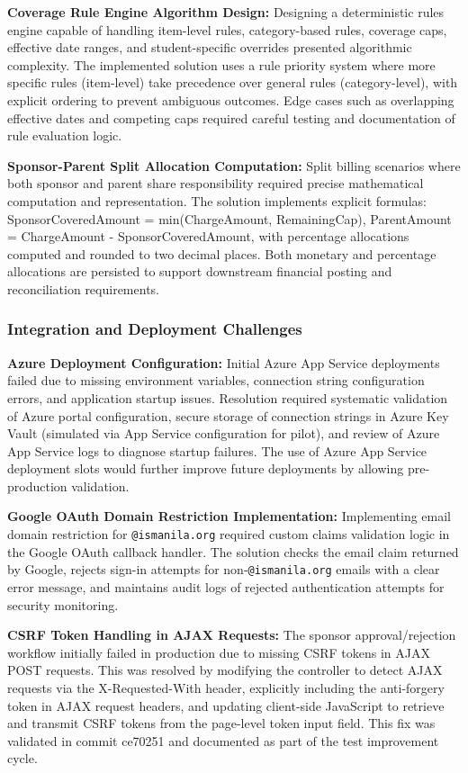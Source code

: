 \textbf{Coverage Rule Engine Algorithm Design:} Designing a deterministic rules engine capable of handling item-level rules, category-based rules, coverage caps, effective date ranges, and student-specific overrides presented algorithmic complexity. The implemented solution uses a rule priority system where more specific rules (item-level) take precedence over general rules (category-level), with explicit ordering to prevent ambiguous outcomes. Edge cases such as overlapping effective dates and competing caps required careful testing and documentation of rule evaluation logic.

\textbf{Sponsor-Parent Split Allocation Computation:} Split billing scenarios where both sponsor and parent share responsibility required precise mathematical computation and representation. The solution implements explicit formulas: SponsorCoveredAmount = min(ChargeAmount, RemainingCap), ParentAmount = ChargeAmount - SponsorCoveredAmount, with percentage allocations computed and rounded to two decimal places. Both monetary and percentage allocations are persisted to support downstream financial posting and reconciliation requirements.

\subsubsection{Integration and Deployment Challenges}

\textbf{Azure Deployment Configuration:} Initial Azure App Service deployments failed due to missing environment variables, connection string configuration errors, and application startup issues. Resolution required systematic validation of Azure portal configuration, secure storage of connection strings in Azure Key Vault (simulated via App Service configuration for pilot), and review of Azure App Service logs to diagnose startup failures. The use of Azure App Service deployment slots would further improve future deployments by allowing pre-production validation.

\textbf{Google OAuth Domain Restriction Implementation:} Implementing email domain restriction for \texttt{@ismanila.org} required custom claims validation logic in the Google OAuth callback handler. The solution checks the email claim returned by Google, rejects sign-in attempts for non-\texttt{@ismanila.org} emails with a clear error message, and maintains audit logs of rejected authentication attempts for security monitoring.

\textbf{CSRF Token Handling in AJAX Requests:} The sponsor approval/rejection workflow initially failed in production due to missing CSRF tokens in AJAX POST requests. This was resolved by modifying the controller to detect AJAX requests via the X-Requested-With header, explicitly including the anti-forgery token in AJAX request headers, and updating client-side JavaScript to retrieve and transmit CSRF tokens from the page-level token input field. This fix was validated in commit ce70251 and documented as part of the test improvement cycle.

